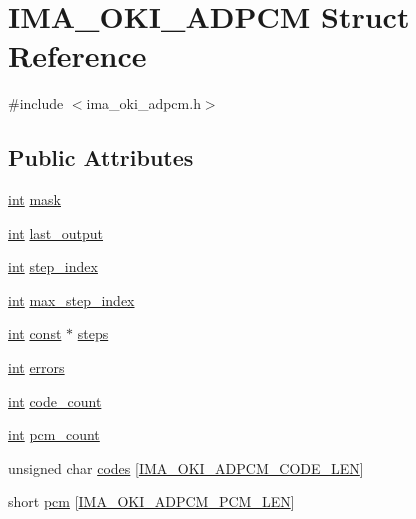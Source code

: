 \hypertarget{struct_i_m_a___o_k_i___a_d_p_c_m}{}\section{I\+M\+A\+\_\+\+O\+K\+I\+\_\+\+A\+D\+P\+CM Struct Reference}
\label{struct_i_m_a___o_k_i___a_d_p_c_m}


{\ttfamily \#include $<$ima\+\_\+oki\+\_\+adpcm.\+h$>$}

\subsection*{Public Attributes}
\begin{DoxyCompactItemize}
\item 
\hyperlink{xmltok_8h_a5a0d4a5641ce434f1d23533f2b2e6653}{int} \hyperlink{struct_i_m_a___o_k_i___a_d_p_c_m_a3d6f8bca60b82e91d57c04034c0e2a4b}{mask}
\item 
\hyperlink{xmltok_8h_a5a0d4a5641ce434f1d23533f2b2e6653}{int} \hyperlink{struct_i_m_a___o_k_i___a_d_p_c_m_a8144caa1c82947a2b720dd939a5a1114}{last\+\_\+output}
\item 
\hyperlink{xmltok_8h_a5a0d4a5641ce434f1d23533f2b2e6653}{int} \hyperlink{struct_i_m_a___o_k_i___a_d_p_c_m_ad4eb450df57148fd979808a79a4469d6}{step\+\_\+index}
\item 
\hyperlink{xmltok_8h_a5a0d4a5641ce434f1d23533f2b2e6653}{int} \hyperlink{struct_i_m_a___o_k_i___a_d_p_c_m_abf3030a142bef3386328ea9a9c133d44}{max\+\_\+step\+\_\+index}
\item 
\hyperlink{xmltok_8h_a5a0d4a5641ce434f1d23533f2b2e6653}{int} \hyperlink{getopt1_8c_a2c212835823e3c54a8ab6d95c652660e}{const} $\ast$ \hyperlink{struct_i_m_a___o_k_i___a_d_p_c_m_ac7996ca4699d1e0694e4dc90ba0d9355}{steps}
\item 
\hyperlink{xmltok_8h_a5a0d4a5641ce434f1d23533f2b2e6653}{int} \hyperlink{struct_i_m_a___o_k_i___a_d_p_c_m_a1f8086b986e83a7036b819f95cc2fd3e}{errors}
\item 
\hyperlink{xmltok_8h_a5a0d4a5641ce434f1d23533f2b2e6653}{int} \hyperlink{struct_i_m_a___o_k_i___a_d_p_c_m_aab39bf9aefa5d488d28c513a627d2c98}{code\+\_\+count}
\item 
\hyperlink{xmltok_8h_a5a0d4a5641ce434f1d23533f2b2e6653}{int} \hyperlink{struct_i_m_a___o_k_i___a_d_p_c_m_a09920c69650ad4e266126da209377443}{pcm\+\_\+count}
\item 
unsigned char \hyperlink{struct_i_m_a___o_k_i___a_d_p_c_m_a819c2b67b38be32caa93c1a5629ee0d4}{codes} \mbox{[}\hyperlink{ima__oki__adpcm_8h_a62a2b1d5dd5759a511e88a282de39298}{I\+M\+A\+\_\+\+O\+K\+I\+\_\+\+A\+D\+P\+C\+M\+\_\+\+C\+O\+D\+E\+\_\+\+L\+EN}\mbox{]}
\item 
short \hyperlink{struct_i_m_a___o_k_i___a_d_p_c_m_a48853e90c2535830172527bd91747c21}{pcm} \mbox{[}\hyperlink{ima__oki__adpcm_8h_a80884f5c2368eac960a62991907711f3}{I\+M\+A\+\_\+\+O\+K\+I\+\_\+\+A\+D\+P\+C\+M\+\_\+\+P\+C\+M\+\_\+\+L\+EN}\mbox{]}
\end{DoxyCompactItemize}


